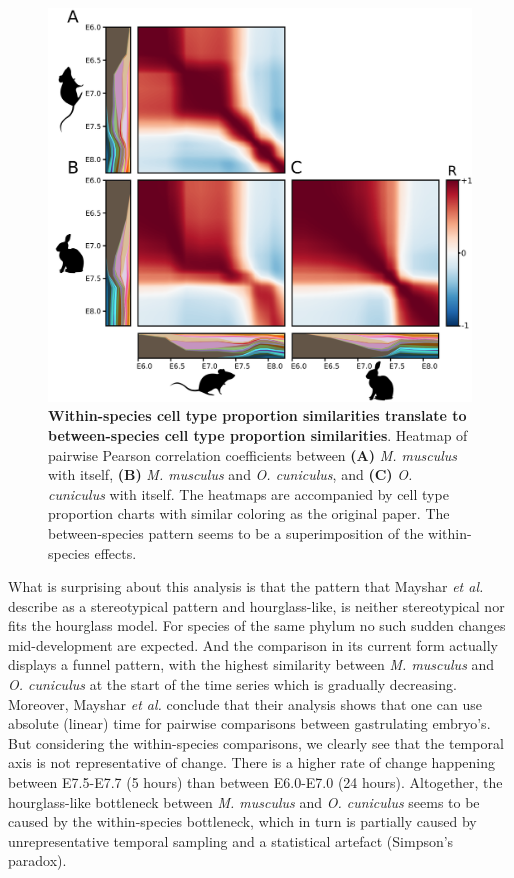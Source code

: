 \begin{figure}[H]
    \includegraphics[width=0.8\linewidth]{ch.hourglass/images/mouse_rabbit_cellproportions.png}
    \caption{\textbf{Within-species cell type proportion similarities translate to between-species cell type proportion similarities}. Heatmap of pairwise Pearson correlation coefficients between \textbf{(A)} \textit{M. musculus} with itself, \textbf{(B)} \textit{M. musculus} and \textit{O. cuniculus}, and \textbf{(C)} \textit{O. cuniculus} with itself. The heatmaps are accompanied by cell type proportion charts with similar coloring as the original paper. The between-species pattern seems to be a superimposition of the within-species effects.}
    \label{fig:cellproportions}
\end{figure}

What is surprising about this analysis is that the pattern that Mayshar \textit{et al.} describe as a stereotypical pattern and hourglass-like, is neither stereotypical nor fits the hourglass model. For species of the same phylum no such sudden changes mid-development are expected. And the comparison in its current form actually displays a funnel pattern, with the highest similarity between \textit{M. musculus} and \textit{O. cuniculus} at the start of the time series which is gradually decreasing. Moreover, Mayshar \textit{et al.} conclude that their analysis shows that one can use absolute (linear) time for pairwise comparisons between gastrulating embryo's. But considering the within-species comparisons, we clearly see that the temporal axis is not representative of change. There is a higher rate of change happening between E7.5-E7.7 (5 hours) than between E6.0-E7.0 (24 hours). Altogether, the hourglass-like bottleneck between \textit{M. musculus} and \textit{O. cuniculus} seems to be caused by the within-species bottleneck, which in turn is partially caused by unrepresentative temporal sampling and a statistical artefact (Simpson's paradox).


